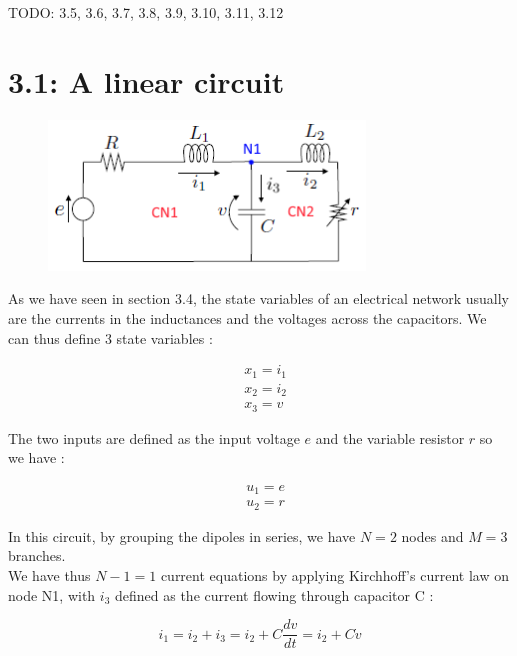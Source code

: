 TODO: 3.5, 3.6, 3.7, 3.8, 3.9, 3.10, 3.11, 3.12


\section*{3.1: A linear circuit}

\begin{figure}[htbp]
\begin{center}
\includegraphics[height=4cm]{ex31}
\end{center}
\end{figure}

As we have seen in section 3.4, the state variables of an electrical network usually are the currents in the inductances and the voltages across the capacitors. We can thus define 3 state variables :

\begin{equation}
\begin{split}
&x_1 = i_1\\
&x_2=i_2\\
&x_3=v
\end{split} 
\end{equation}

The two inputs are defined as the input voltage $e$ and the variable resistor $r$ so we have :

\begin{equation}
\begin{split}
&u_1 = e\\
&u_2=r
\end{split} 
\end{equation}


In this circuit, by grouping the dipoles in series, we have $N=2$ nodes and $M=3$ branches.\\

We have thus $N-1=1$ current equations by applying Kirchhoff's current law on node N1, with $i_3$ defined as the current flowing through capacitor C :

\begin{equation}
i_1 =i_2+i_3 =i_2 + C \frac{dv}{dt} = i_2 + C\dot{v}
\end{equation}




